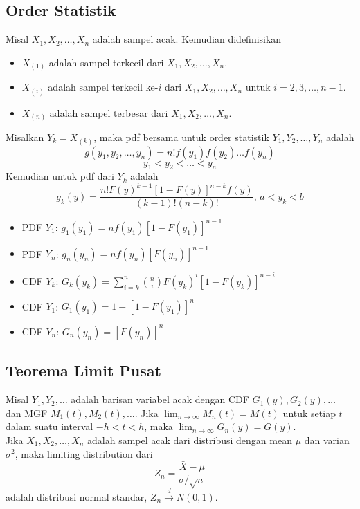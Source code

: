 \documentclass[a4paper,extrafontsizes, 9pt]{memoir}
\begin{document}
\begin{multicols}{3}
            \subsection*{\small Order Statistik}
                Misal $X_1, X_2, \dots, X_n$ adalah sampel acak. Kemudian didefinisikan
                \begin{itemize}
                    \item $X_{(1)}$ adalah sampel terkecil dari $X_1, X_2, \dots, X_n$.
                    \item $X_{(i)}$ adalah sampel terkecil ke-$i$ dari $X_1, X_2, \dots, X_n$ untuk $i=2,3,\dots,n-1$.
                    \item $X_{(n)}$ adalah sampel terbesar dari $X_1, X_2, \dots, X_n$.
                \end{itemize}
                Misalkan $Y_k=X_{(k)}$, maka pdf bersama untuk order statistik $Y_1,Y_2,\dots,Y_n$ adalah
                \[g(y_1,y_2,\dots,y_n) = n!f(y_1)f(y_2)\dots f(y_n)\]
                \[y_1<y_2<\dots<y_n\]
                Kemudian untuk pdf dari $Y_k$ adalah
                \[g_{k}(y) = \dfrac{n!F(y)^{k-1}[1-F(y)]^{n-k}f(y)}{(k-1)!(n-k)!},\,a<y_k<b\]
                \begin{itemize}
                    \item PDF $Y_1$: $g_1(y_1) = nf(y_1)[1-F(y_1)]^{n-1}$
                    \item PDF $Y_n$: $g_n(y_n) = nf(y_n)[F(y_n)]^{n-1}$
                    \item CDF $Y_k$: $G_k(y_k) = \sum_{i=k}^{n}\binom{n}{i}F(y_k)^{i}[1-F(y_k)]^{n-i}$
                    \item CDF $Y_1$: $G_1(y_1) = 1-[1-F(y_1)]^{n}$
                    \item CDF $Y_n$: $G_n(y_n) = [F(y_n)]^{n}$
                \end{itemize}
                \subsection*{\small Teorema Limit Pusat}
                Misal $Y_1,Y_2,\dots$ adalah barisan variabel acak dengan CDF $G_1(y),G_2(y),\dots$ dan MGF $M_1(t),M_2(t),\dots$. Jika $\displaystyle\lim_{n\to\infty}M_n(t)=M(t)$ untuk setiap $t$ dalam suatu interval $-h<t<h$, maka $\displaystyle\lim_{n\to\infty}G_n(y)=G(y)$.\\

                Jika $X_1,X_2,\dots,X_n$ adalah sampel acak dari distribusi dengan mean $\mu$ dan varian $\sigma^2$, maka limiting distribution dari
                \[Z_n=\dfrac{\bar{X}-\mu}{\sigma/\sqrt{n}}\]
                adalah distribusi normal standar, $Z_n\xrightarrow{d} N(0,1)$.


\end{multicols}
\end{document}
